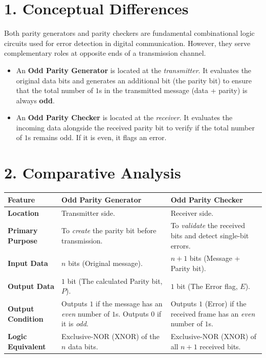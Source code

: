 \documentclass[12pt,a3paper]{article}
\begin{document}
\begin{enumerate}
\begin{tcolorbox}[enhanced,breakable,ansbox,colback=cA!4,colframe=cA,boxrule=0.8pt,arc=5pt,title={\textbf{Answer}},fonttitle=\bfseries\color{white},colbacktitle=cA]

\section*{1. Conceptual Differences}

Both parity generators and parity checkers are fundamental combinational logic circuits used for error detection in digital communication. However, they serve complementary roles at opposite ends of a transmission channel. 

\begin{itemize}
    \item An \textbf{\textcolor{cA}{Odd Parity Generator}} is located at the \textit{transmitter}. It evaluates the original data bits and generates an additional bit (the parity bit) to ensure that the total number of $1$s in the transmitted message (data + parity) is always \textbf{odd}.
    \item An \textbf{\textcolor{cA}{Odd Parity Checker}} is located at the \textit{receiver}. It evaluates the incoming data alongside the received parity bit to verify if the total number of $1$s remains odd. If it is even, it flags an error.
\end{itemize}

\vspace{0.2cm}

\section*{2. Comparative Analysis}

\begin{center}
\renewcommand{\arraystretch}{1.4}
\begin{tabular}{p{3.5cm} p{5.5cm} p{5.5cm}}
    \toprule
    \textbf{Feature} & \textbf{Odd Parity Generator} & \textbf{Odd Parity Checker} \\
    \midrule
    \textbf{Location} & Transmitter side. & Receiver side. \\
    \textbf{Primary Purpose} & To \textit{create} the parity bit before transmission. & To \textit{validate} the received bits and detect single-bit errors. \\
    \textbf{Input Data} & $n$ bits (Original message). & $n + 1$ bits (Message + Parity bit). \\
    \textbf{Output Data} & $1$ bit (The calculated Parity bit, $P$). & $1$ bit (The Error flag, $E$). \\
    \textbf{Output Condition} & Outputs $1$ if the message has an \textit{even} number of $1$s. Outputs $0$ if it is \textit{odd}. & Outputs $1$ (Error) if the received frame has an \textit{even} number of $1$s. \\
    \textbf{Logic Equivalent} & Exclusive-NOR (XNOR) of the $n$ data bits. & Exclusive-NOR (XNOR) of all $n+1$ received bits. \\
    \bottomrule
\end{tabular}
\end{center}


\end{tcolorbox}
\end{enumerate}
\end{document}
